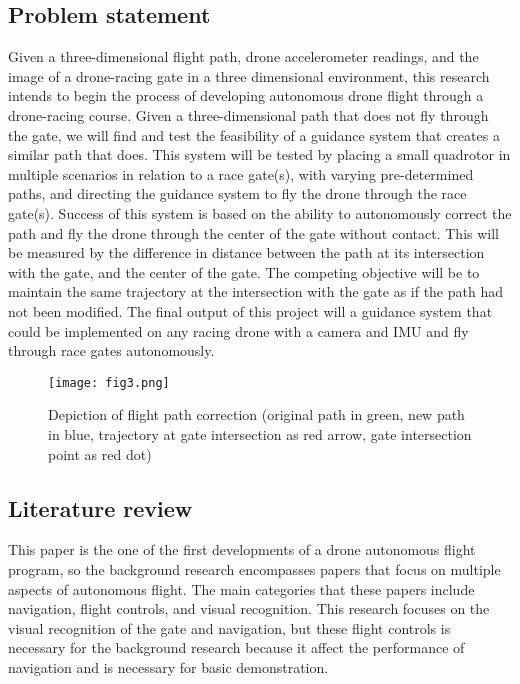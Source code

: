 \documentclass[onecolumn,10pt]{IEEEtran}
\begin{document}
\subsection{Problem statement}
Given a three-dimensional flight path, drone accelerometer readings, and the image of a drone-racing gate in a three dimensional environment, this research intends to begin the process of developing autonomous drone flight through a drone-racing course. Given a three-dimensional path that does not fly through the gate, we will find and test the feasibility of a guidance system that creates a similar path that does. This system will be tested by placing a small quadrotor in multiple scenarios in relation to a race gate(s), with varying pre-determined paths, and directing the guidance system to fly the drone through the race gate(s). Success of this system is based on the ability to autonomously correct the path and fly the drone through the center of the gate without contact. This will be measured by the difference in distance between the path at its intersection with the gate, and the center of the gate. The competing objective will be to maintain the same trajectory at the intersection with the gate as if the path had not been modified. The final output of this project will a guidance system that could be implemented on any racing drone with a camera and IMU and fly through race gates autonomously.
\begin{figure}[t]
\begin{center}
\texttt{[image: fig3.png]}
\end{center}
\caption{Depiction of flight path correction (original path in green, new path in blue, trajectory at gate intersection as red arrow, gate intersection point as red dot)}
\label{fig:3}
\end{figure}

\subsection{Literature review}
This paper is the one of the first developments of a drone autonomous flight program, so the background research encompasses papers that focus on multiple aspects of autonomous flight. The main categories that these papers include navigation, flight controls, and visual recognition. This research focuses on the visual recognition of the gate and navigation, but these flight controls is necessary for the background research because it affect the performance of navigation and is necessary for basic demonstration.
\end{document}
